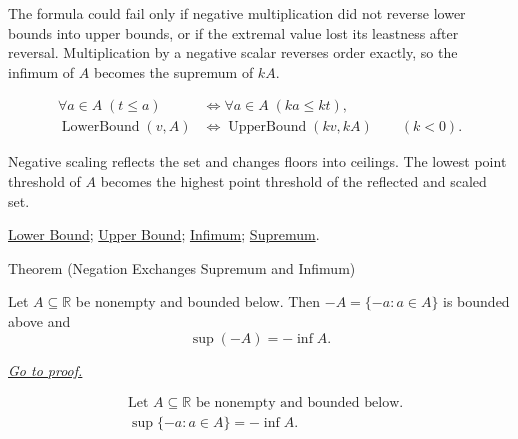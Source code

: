 \begin{remark*}
The formula could fail only if negative multiplication did not reverse lower bounds into upper bounds, or if the extremal value lost its leastness after reversal. Multiplication by a negative scalar reverses order exactly, so the infimum of $A$ becomes the supremum of $kA$.
\end{remark*}

\begin{remark*}
\[
\begin{aligned}
\forall a\in A\;(t\le a)
&\Longleftrightarrow
\forall a\in A\;(ka\le kt),\\
\operatorname{LowerBound}(v,A)
&\Longleftrightarrow
\operatorname{UpperBound}(kv,kA)
\qquad(k<0).
\end{aligned}
\]
\end{remark*}

\begin{remark*}[Interpretation]
Negative scaling reflects the set and changes floors into ceilings. The lowest point threshold of $A$ becomes the highest point threshold of the reflected and scaled set.
\end{remark*}

\begin{remark*}[Dependencies]
\hyperref[def:lower-bound]{Lower Bound};
\hyperref[def:upper-bound]{Upper Bound};
\hyperref[def:infimum]{Infimum};
\hyperref[def:supremum]{Supremum}.
\end{remark*}


\begin{theorembox}{Theorem (Negation Exchanges Supremum and Infimum)}
\begin{theorem}
\label{thm:negation-exchange-sup-inf}
Let $A\subseteq\mathbb{R}$ be nonempty and bounded below. Then $-A=\{-a:a\in A\}$ is bounded above and
\[
  \sup(-A)=-\inf A.
\]

\smallskip
\noindent
\hyperref[prf:negation-exchange-sup-inf]{\textit{Go to proof.}}
\end{theorem}
\end{theorembox}

\begin{remark*}
\[
\begin{aligned}
&\text{Let }A\subseteq\mathbb{R}\text{ be nonempty and bounded below.}\\
&\sup\{-a:a\in A\}=-\inf A.
\end{aligned}
\]
\end{remark*}

